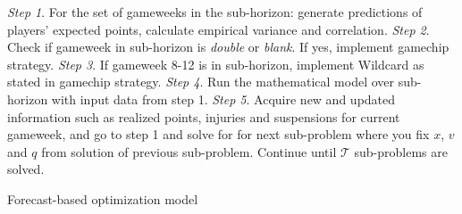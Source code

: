 \textit{Step 1}. For the set of gameweeks in the sub-horizon:  generate predictions of players' expected points, calculate empirical variance and correlation. 
\newline
\textit{Step 2}. Check if gameweek in sub-horizon is \textit{double} or \textit{blank}. If yes, implement gamechip strategy. 
\newline
\textit{Step 3}. If gameweek 8-12 is in sub-horizon, implement Wildcard as stated in gamechip strategy. 
\newline
\textit{Step 4}. Run the mathematical model over sub-horizon with input data from step 1. 
\newline
\textit{Step 5}. Acquire new and updated information such as realized points, injuries and suspensions for current gameweek, and go to step 1 and solve for for next sub-problem where you fix $x$, $v$ and $q$ from solution of previous sub-problem. Continue until $\mathcal{T}$ sub-problems are solved.

\newpar

\begin{algorithm}
\caption{Forecast-based optimization model}
\begin{algorithmic}
    \EndIf
\EndWhile
\end{algorithmic}
\end{algorithm}

